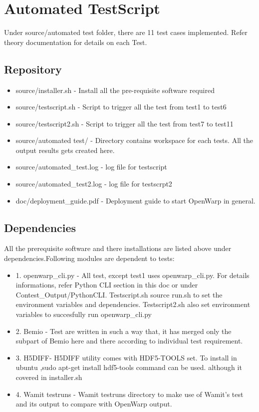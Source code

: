 \documentclass[12pt]{article}
\begin{document}
\section{Automated TestScript}

Under source/automated test folder, there are  11 test cases implemented. Refer theory documentation for details on each Test.

\subsection{Repository}
\begin{itemize}
\item source/installer.sh - Install all the pre-requisite software required
\item source/testscript.sh - Script to trigger all the test from test1 to test6
\item source/testscript2.sh - Script to trigger all the test from test7 to test11
\item source/automated test/ - Directory contains workspace  for each tests. All the output results gets created here.
\item source/automated_test.log - log file for testscript
\item source/automated_test2.log - log file for testscrpt2
\item doc/deployment_guide.pdf - Deployment guide to start OpenWarp in general.
\end{itemize}

\subsection{Dependencies}
All the prerequisite software and there installations are listed above under dependencies.Following modules are dependent to tests:
\begin{itemize}
\item 1.	openwarp_cli.py - All test, except test1 uses openwarp_cli.py. For details informations, refer Python CLI section in this doc or under Contest_Output/PythonCLI. Testscript.sh source run.sh to set the environment variables and dependencies. Testscript2.sh also set environment variables to succesfully run openwarp_cli.py
\item 2.	Bemio - Test are written in such a way that, it has merged only the subpart of Bemio here and there according to individual test requirement.
\item 3.	H5DIFF- H5DIFF utility comes with HDF5-TOOLS set. To install in ubuntu ,sudo apt-get install hdf5-tools command can be used. although it covered in installer.sh
\item 4.	Wamit testruns -  Wamit testruns directory to make use of Wamit's test and its output to compare with OpenWarp output.
\end{itemize}
\end{document}

